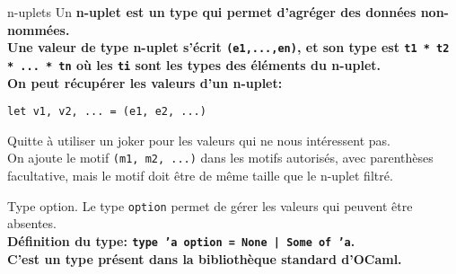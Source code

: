 \documentclass[french, 11pt]{article}
\begin{document}
\begin{defi}{n-uplets}{}
    Un \bf{n-uplet} est un type qui permet d'agréger des données non-nommées.\\
    Une valeur de type n-uplet s'écrit \texttt{(e1,...,en)}, et son type est \texttt{t1 * t2 * ... * tn} où les \texttt{ti} sont les types des éléments du n-uplet.\\
    On peut récupérer les valeurs d'un n-uplet:
    \begin{center}
        \texttt{let v1, v2, ... = (e1, e2, ...)}
    \end{center}
    Quitte à utiliser un joker pour les valeurs qui ne nous intéressent pas.\\
    On ajoute le motif \texttt{(m1, m2, ...)} dans les motifs autorisés, avec parenthèses facultative, mais le motif doit être de même taille que le n-uplet filtré.
\end{defi}

\begin{defi}{Type option.}{}
    Le type \texttt{option} permet de gérer les valeurs qui peuvent être absentes.\\
    \bf{Définition du type:} \texttt{type 'a option = None | Some of 'a}.\\
    C'est un type présent dans la bibliothèque standard d'OCaml.
\end{defi}
\end{document}
